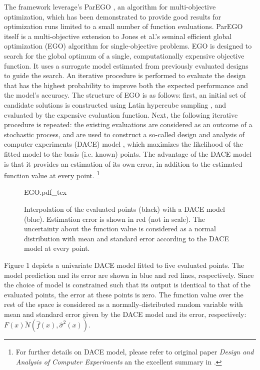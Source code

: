 \documentclass[10pt]{llncs}
\begin{document}
The framework leverage's ParEGO \cite{knowles2005multiobjective,Knowles2006ParEGO}, an algorithm for multi-objective optimization, which has been demonstrated to provide good results for optimization runs limited to a small number of function evaluations. ParEGO itself is a multi-objective extension to Jones et al.'s \cite{Jones1998Efficient} seminal efficient global optimization (EGO) algorithm for single-objective problems. EGO is designed to search for the global optimum of a single, computationally expensive objective function. It uses a surrogate model estimated from previously evaluated designs to guide the search. An iterative procedure is performed to evaluate the design that has the highest probability to improve both
the expected performance and the model's accuracy. The structure of EGO is as follows: first, an initial set of candidate solutions is constructed using Latin hypercube sampling \cite{Scheffe1958Experiments}, and evaluated by the expensive evaluation function. Next, the following iterative procedure is repeated: the existing evaluations are considered as an outcome of a stochastic process, and are used to construct a so-called design and analysis of computer experiments (DACE) model \cite{Sacks1989Design}, which maximizes the likelihood of the fitted model to the basis (i.e. known) points. The advantage of the DACE model is that it provides an estimation of its own error, in addition to the estimated function value at every point. \footnote{For further details on DACE model, please refer to original paper \textit{Design and Analysis of Computer Experiments} \cite{Sacks1989Design} an the excellent summary in \cite{Jones1998Efficient}.} 
\begin{figure}
\centering
\def\svgwidth{0.70\textwidth}
{EGO.pdf_tex}
\caption{Interpolation of the evaluated points (black) with a DACE model (blue). Estimation error is shown in red (not in scale). The uncertainty about the function value is considered as a normal distribution with mean and standard error according to the DACE model at every point.}
\label{fig:convergence}
\end{figure}

Figure 1 depicts a univariate DACE model fitted to five evaluated points. The model prediction and its error are shown in blue and red lines, respectively. Since the choice of model is constrained such that its output is identical to that of the evaluated points, the error at these points is zero. The function value over the rest of the space is considered as a normally-distributed random variable with mean and standard error given by the DACE model and its error, respectively: $F(x)\tilde{N}(\hat{f}(x),{\hat{\sigma}}^2(x))$.
\end{document}
